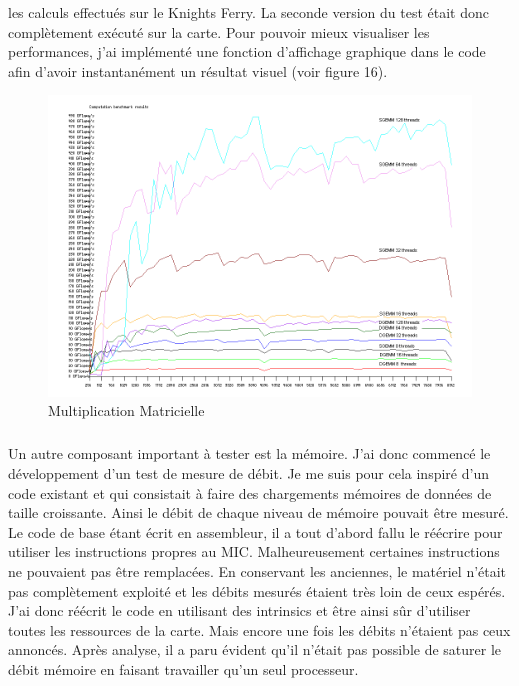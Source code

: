 \documentclass[11pt]{article}
\begin{document}
					les calculs effectués sur le Knights Ferry. \newline
					La seconde version du test était donc complètement exécuté sur la carte. Pour pouvoir mieux visualiser
					les performances, j'ai implémenté une fonction d'affichage graphique dans le code afin d'avoir instantanément
					un résultat visuel (voir figure 16).
					\begin{figure}
					\begin{center}
					\includegraphics[scale=0.4]{gflops_SGEMM.png}
					\caption{Multiplication Matricielle}
					\end{center}
					\end{figure}
					\subparagraph{}
					Un autre composant important à tester est la mémoire. J'ai donc commencé le développement d'un test de mesure
					de débit. Je me suis pour cela inspiré d'un code existant et qui consistait à faire des chargements mémoires
					de données de taille croissante. Ainsi le débit de chaque niveau de mémoire pouvait être mesuré. Le code de base étant 
					écrit en assembleur, il a tout d'abord fallu le réécrire pour utiliser les instructions propres au MIC. 
					Malheureusement certaines instructions ne pouvaient pas être remplacées. En conservant les anciennes, le 
					matériel n'était pas complètement exploité et les débits mesurés étaient très loin de ceux espérés.
					J'ai donc réécrit le code en utilisant des intrinsics et être ainsi sûr d'utiliser toutes les ressources
					de la carte. Mais encore une fois les débits n'étaient pas ceux annoncés. Après analyse, il a paru évident
					qu'il n'était pas possible de saturer le débit mémoire en faisant travailler qu'un seul processeur.
\end{document}
